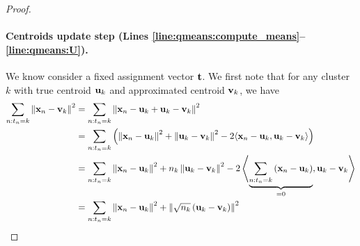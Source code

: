 \begin{proof}
\paragraph{Centroids update step (Lines \ref{line:qmeans:compute_means}--\ref{line:qmeans:U}).} We know consider a fixed assignment vector ${\mathbf{t}}$. We first note that for any cluster $k$ with true centroid ${\mathbf{u}}_k$ and approximated centroid ${\mathbf{v}}_k$, we have
\begin{align*}
	\sum_{n: t_n = k} \left \| {\mathbf{x}}_n -{\mathbf{v}}_k\right \|^2
	 & =\sum_{n: t_n = k} \left \| {\mathbf{x}}_n -{\mathbf{u}}_k+{\mathbf{u}}_k-{\mathbf{v}}_k\right \|^2\\
	& = \sum_{n: t_n = k}\left(\left \| {\mathbf{x}}_n-{\mathbf{u}}_k\right \|^2+\left \| {\mathbf{u}}_k-{\mathbf{v}}_k\right \|^2-2\langle{\mathbf{x}}_n-{\mathbf{u}}_k,{\mathbf{u}}_k-{\mathbf{v}}_k\rangle\right)\notag\\
	& = \sum_{n: t_n= k} \left \| {\mathbf{x}}_n-{\mathbf{u}}_k\right \|^2+n_k\left \| {\mathbf{u}}_k-{\mathbf{v}}_k\right \|^2 - 2 \left\langle\underbrace{\sum_{n: t_n = k}\left ({\mathbf{x}}_n-{\mathbf{u}}_k\right )}_{=0},{\mathbf{u}}_k-{\mathbf{v}}_k\right\rangle\notag\\
	&= \sum_{n: t_n = k} \left \| {\mathbf{x}}_n-{\mathbf{u}}_k\right \|^2 + \left \| \sqrt{n_k}\left ({\mathbf{u}}_k-{\mathbf{v}}_k\right )\right \|^2
\end{align*}


\end{proof}
